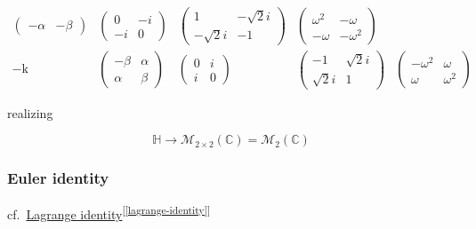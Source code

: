 \documentclass[
]{book}
\theoremstyle{definition}
\theoremstyle{definition}
\theoremstyle{definition}
\theoremstyle{definition}
\theoremstyle{remark}
\begin{document}
\[\begin{array}{ccccc}
\begin{pmatrix}
-\alpha & -\beta
\end{pmatrix} & \begin{pmatrix}0 & -i\\
-i & 0
\end{pmatrix} & \begin{pmatrix}1 & -\sqrt{2}i\\
-\sqrt{2}i & -1
\end{pmatrix} & \begin{pmatrix}\omega^{2} & -\omega\\
-\omega & -\omega^{2}
\end{pmatrix}\\
-\mathrm{k} & \begin{pmatrix}-\beta & \alpha\\
\alpha & \beta
\end{pmatrix} & \begin{pmatrix}0 & i\\
i & 0
\end{pmatrix} & \begin{pmatrix}-1 & \sqrt{2}i\\
\sqrt{2}i & 1
\end{pmatrix} & \begin{pmatrix}-\omega^{2} & \omega\\
\omega & \omega^{2}
\end{pmatrix}
\end{array}
\]

realizing

\[
\mathbb{H}\rightarrow\mathcal{M}_{2\times2}\left(\mathbb{C}\right)=\mathcal{M}_{2}\left(\mathbb{C}\right)
\]

\subsubsection{Euler identity}\label{euler-identity}

cf.~\hyperref[lagrange-identity]{Lagrange identity}\textsuperscript{{[}\ref{lagrange-identity}{]}}
\end{document}
